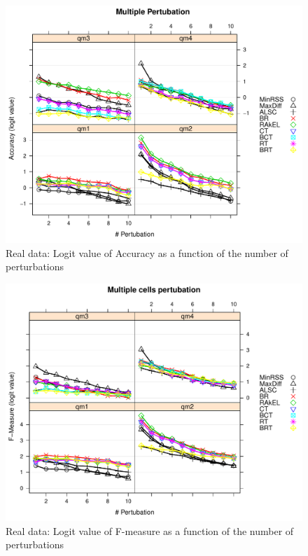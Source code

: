 \documentclass[11pt]{article}
\begin{document}
\begin{figure}
  \centering
    \includegraphics[width=100 mm ,scale=0.25]{graph/SA.pdf}
  \caption{Real data: Logit value of Accuracy as a function of the number of perturbations}\label{fig:SAforReal}
\end{figure}

\begin{figure}
  \centering
    \includegraphics[width=100 mm ,scale=0.25]{graph/FM.pdf}
    \caption{Real data: Logit value of F-measure as a function of the number of perturbations}\label{fig:FMforReal}
\end{figure}



\end{document}

